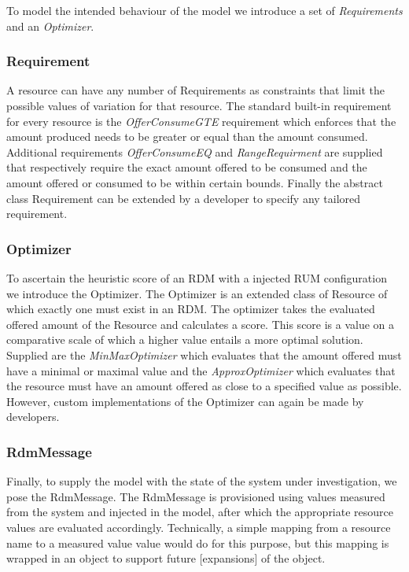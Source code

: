 To model the intended behaviour of the model we introduce a set of \emph{Requirements} and an \emph{Optimizer}.
\subsubsection{Requirement}
A resource can have any number of Requirements as constraints that limit the possible values of variation for that resource. The standard built-in requirement for every resource is the \emph{OfferConsumeGTE} requirement which enforces that the amount produced needs to be greater or equal than the amount consumed. Additional requirements \emph{OfferConsumeEQ} and \emph{RangeRequirment} are supplied that respectively require the exact amount offered to be consumed and the amount offered or consumed to be within certain bounds. Finally the abstract class Requirement can be extended by a developer to specify any tailored requirement.
\subsubsection{Optimizer}
To ascertain the heuristic score of an RDM with a injected RUM configuration we introduce the Optimizer. The Optimizer is an extended class of Resource of which exactly one must exist in an RDM. The optimizer takes the evaluated offered amount of the Resource and calculates a score. This score is a value on a comparative scale of which a higher value entails a more optimal solution. Supplied are the \emph{MinMaxOptimizer} which evaluates that the amount offered must have a minimal or maximal value and the \emph{ApproxOptimizer} which evaluates that the resource must have an amount offered as close to a specified value as possible. However, custom implementations of the Optimizer can again be made by developers.

\subsubsection{RdmMessage}
Finally, to supply the model with the state of the system under investigation, we pose the RdmMessage. The RdmMessage is provisioned using values measured from the system and injected in the model, after which the appropriate resource values are evaluated accordingly. Technically, a simple mapping from a resource name to a measured value value would do for this purpose, but this mapping is wrapped in an object to support future [expansions] of the object.

